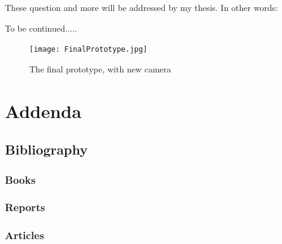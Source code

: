 \documentclass[11pt,fleqn,,a4paper,twoside,openright]{book}
\begin{document}
These question and more will be addressed by my thesis. In other words:

\begin{center}
	To be continued.....
\end{center}

\begin{figure}[h]
	\centering
	\texttt{[image: FinalPrototype.jpg]}	
	\caption{The final prototype, with new camera}
	\label{fig:FinalPrototype}
\end{figure}

\part{Addenda}\label{part:Addenda}
\chapter*{Bibliography}
\section*{Books}
\printbibliography[heading=bibempty,type=book]
\section*{Reports}
\printbibliography[heading=bibempty,type=report]
\section*{Articles}
\printbibliography[heading=bibempty,type=article]

\cleardoublepage
{}
\setlength{\columnsep}{0.75cm}
\printindex

\appendix
{}
\end{document}
